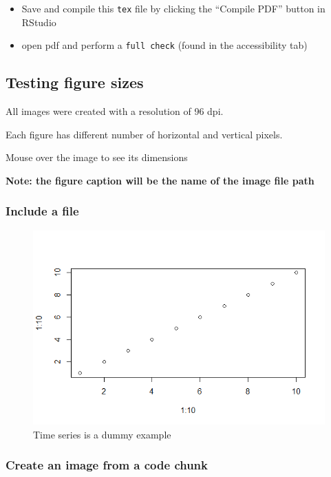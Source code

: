 \documentclass[
]{article}
\providecommand{\tightlist}{%
  \setlength{\itemsep}{0pt}\setlength{\parskip}{0pt}}
\begin{document}
\begin{itemize}
\tightlist
\item
  Save and compile this \texttt{tex} file by clicking the ``Compile
  PDF'' button in RStudio
\item
  open pdf and perform a \texttt{full\ check} (found in the
  accessibility tab)
\end{itemize}

\subsection{Testing figure sizes}\label{testing-figure-sizes}

All images were created with a resolution of 96 dpi.

Each figure has different number of horizontal and vertical pixels.

Mouse over the image to see its dimensions

\textbf{Note: the figure caption will be the name of the image file
path}

\subsubsection{Include a file}\label{include-a-file}

\begin{figure}
\includegraphics[width=600px]{figures/test6} \caption{Time series is a dummy example}\label{fig:test6}
\end{figure}

\subsubsection{Create an image from a code
chunk}\label{create-an-image-from-a-code-chunk}
\end{document}
